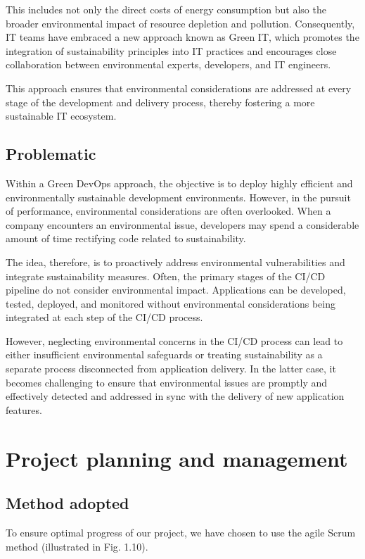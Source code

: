 This includes not only the direct costs of energy consumption but also the broader environmental impact of resource depletion and pollution. Consequently, IT teams have embraced a new approach known as Green IT, which promotes the integration of sustainability principles into IT practices and encourages close collaboration between environmental experts, developers, and IT engineers.

This approach ensures that environmental considerations are addressed at every stage of the development and delivery process, thereby fostering a more sustainable IT ecosystem.

\subsection{Problematic}

Within a Green DevOps approach, the objective is to deploy highly efficient and environmentally sustainable development environments. However, in the pursuit of performance, environmental considerations are often overlooked. When a company encounters an environmental issue, developers may spend a considerable amount of time rectifying code related to sustainability.

The idea, therefore, is to proactively address environmental vulnerabilities and integrate sustainability measures. Often, the primary stages of the CI/CD pipeline do not consider environmental impact. Applications can be developed, tested, deployed, and monitored without environmental considerations being integrated at each step of the CI/CD process.

However, neglecting environmental concerns in the CI/CD process can lead to either insufficient environmental safeguards or treating sustainability as a separate process disconnected from application delivery. In the latter case, it becomes challenging to ensure that environmental issues are promptly and effectively detected and addressed in sync with the delivery of new application features.

\section{Project planning and management}
\subsection{Method adopted}

To ensure optimal progress of our project, we have chosen to use the agile Scrum method (illustrated in Fig. 1.10).

